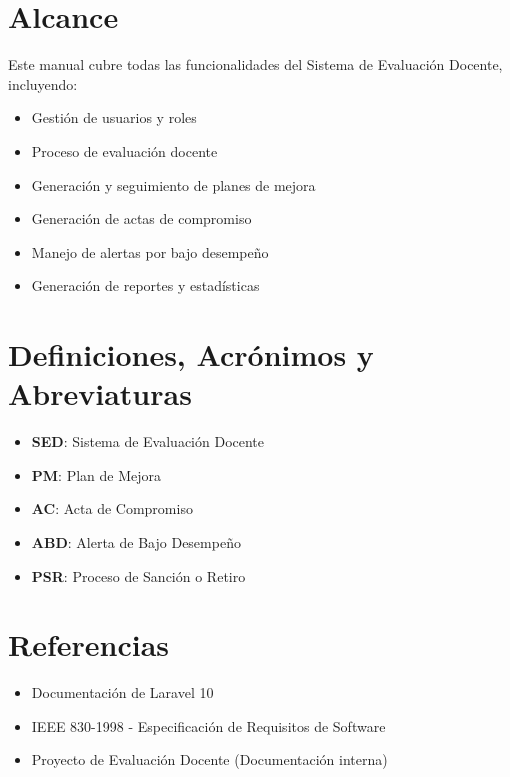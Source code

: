\documentclass[12pt,a4paper]{book}
\begin{document}
\section{Alcance}
Este manual cubre todas las funcionalidades del Sistema de Evaluación Docente, incluyendo:
\begin{itemize}
    \item Gestión de usuarios y roles
    \item Proceso de evaluación docente
    \item Generación y seguimiento de planes de mejora
    \item Generación de actas de compromiso
    \item Manejo de alertas por bajo desempeño
    \item Generación de reportes y estadísticas
\end{itemize}

\section{Definiciones, Acrónimos y Abreviaturas}
\begin{itemize}
    \item \textbf{SED}: Sistema de Evaluación Docente
    \item \textbf{PM}: Plan de Mejora
    \item \textbf{AC}: Acta de Compromiso
    \item \textbf{ABD}: Alerta de Bajo Desempeño
    \item \textbf{PSR}: Proceso de Sanción o Retiro
\end{itemize}

\section{Referencias}
\begin{itemize}
    \item Documentación de Laravel 10
    \item IEEE 830-1998 - Especificación de Requisitos de Software
    \item Proyecto de Evaluación Docente (Documentación interna)
\end{itemize}
\end{document}
